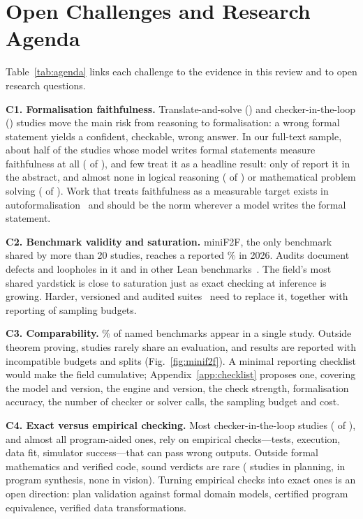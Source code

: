 \section{Open Challenges and Research Agenda}
\label{sec:challenges}

Table~\ref{tab:agenda} links each challenge to the evidence in this review and to open research questions.

\textbf{C1. Formalisation faithfulness.} Translate-and-solve () and checker-in-the-loop () studies move the main risk from reasoning to formalisation: a wrong formal statement yields a confident, checkable, wrong answer. In our full-text sample, about half of the studies whose model writes formal statements measure faithfulness at all ( of ), and few treat it as a headline result: only  of  report it in the abstract, and almost none in logical reasoning ( of ) or mathematical problem solving ( of ). Work that treats faithfulness as a measurable target exists in autoformalisation~\cite{li2024autoformalize,liu2025rethinking,poiroux2025reliable,cabral2026proofflow} and should be the norm wherever a model writes the formal statement.

\textbf{C2. Benchmark validity and saturation.} miniF2F, the only benchmark shared by more than 20 studies, reaches a reported \% in 2026. Audits document defects and loopholes in it and in other Lean benchmarks~\cite{ospanov2025minif2f,ammanamanchi2026faults}. The field's most shared yardstick is close to saturation just as exact checking at inference is growing. Harder, versioned and audited suites~\cite{tsoukalas2024putnambench,hu2025minictx,jiang2026fate,letson2026sorrydb} need to replace it, together with reporting of sampling budgets.

\textbf{C3. Comparability.} \% of named benchmarks appear in a single study. Outside theorem proving, studies rarely share an evaluation, and results are reported with incompatible budgets and splits (Fig.~\ref{fig:minif2f}). A minimal reporting checklist would make the field cumulative; Appendix~\ref{app:checklist} proposes one, covering the model and version, the engine and version, the check strength, formalisation accuracy, the number of checker or solver calls, the sampling budget and cost.

\textbf{C4. Exact versus empirical checking.} Most checker-in-the-loop studies ( of ), and almost all program-aided ones, rely on empirical checks---tests, execution, data fit, simulator success---that can pass wrong outputs. Outside formal mathematics and verified code, sound verdicts are rare ( studies in planning,  in program synthesis, none in vision). Turning empirical checks into exact ones is an open direction: plan validation against formal domain models, certified program equivalence, verified data transformations.


